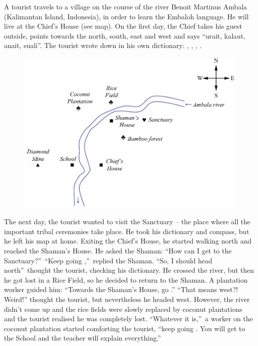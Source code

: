 \begin{refsection}
\begin{problem}{\langnameEmbaloh}{\nameKGilyarova}{}
A tourist travels to a village on the course of the river Benoit Martinus Ambala (Kalimantan Island, Indonesia), in order to learn the Embaloh language. He will live at the Chief's House (see map). On the first day, the Chief takes his guest outside, points towards the north, south, east and west and says “urait, kalaut, anait, suali”. The tourist wrote down in his own dictionary: , , , .\largerpage[2]

\begin{figure}
\includegraphics[width = \linewidth]{images/Embolah_EN.png}
\end{figure}

The next day, the tourist wanted to visit the Sanctuary – the place where all the important tribal ceremonies take place. He took his dictionary and compass, but he left his map at home. Exiting the Chief's House, he started walking north and reached the Shaman's House. He asked the Shaman: “How can I get to the Sanctuary?”\ “Keep going ,”\ replied the Shaman. “So, I should head north”\ thought the tourist, checking his dictionary. He crossed the river, but then he got lost in a Rice Field, so he decided to return to the Shaman. A plantation worker guided him: “Towards the Shaman's House, go .” “That means west?! Weird!” thought the tourist, but nevertheless he headed west. However, the river didn't come up and the rice fields were slowly replaced by coconut plantations and the tourist realised he was completely lost. “Whatever it is,”\ a worker on the coconut plantation started comforting the tourist, “keep going . You will get to the School and the teacher will explain everything.”


\end{problem}
\end{refsection}
